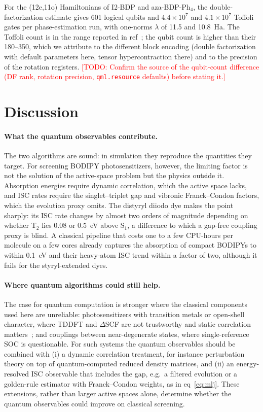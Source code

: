 \documentclass[journal=jpcafh,manuscript=article]{achemso}
\newcommand{\todo}[1]{\textcolor{red}{[TODO: #1]}}
\begin{document}
For the (12e,11o) Hamiltonians of I2-BDP and aza-BDP-Ph$_4$, the double-factorization estimate gives
601 logical qubits and $4.4\times10^{7}$ and $4.1\times10^{7}$ Toffoli gates per phase-estimation run,
with one-norms $\lambda$ of 11.5 and 10.8~Ha. The Toffoli count is in the range reported in
ref~; the qubit count is higher than their 180--350, which we attribute to the
different block encoding (double factorization with default parameters here, tensor hypercontraction
there) and to the precision of the rotation registers. \todo{Confirm the source of the qubit-count
difference (DF rank, rotation precision, \texttt{qml.resource} defaults) before stating it.}

\section{Discussion}

\paragraph{What the quantum observables contribute.} The two algorithms are sound: in simulation they
reproduce the quantities they target. For screening BODIPY photosensitizers, however, the
limiting factor is not the solution of the active-space problem but the physics outside it.
Absorption energies require dynamic correlation, which the active space lacks, and ISC rates require
the singlet--triplet gap and vibronic Franck--Condon factors, which the evolution proxy omits. The
distyryl diiodo dye makes the point sharply: its ISC rate changes by almost two orders of magnitude
depending on whether T$_2$ lies 0.08 or 0.5~eV above S$_1$, a difference to which a gap-free coupling
proxy is blind. A
classical pipeline that costs one to a few CPU-hours per molecule on a few cores already captures the
absorption of compact BODIPYs to within 0.1~eV and their heavy-atom ISC trend within a factor of
two, although it fails for the styryl-extended dyes.

\paragraph{Where quantum algorithms could still help.} The case for quantum computation is stronger
where the classical components used here are unreliable: photosensitizers with transition metals or
open-shell character, where TDDFT and $\Delta$SCF are not trustworthy and static correlation
matters~\cite{Zhou2025}; and couplings between near-degenerate states, where single-reference SOC
is questionable. For such systems the quantum observables should be combined with (i) a dynamic
correlation treatment, for instance perturbation theory on top of quantum-computed reduced density
matrices, and (ii) an energy-resolved ISC observable that includes the gap, e.g.\ a filtered
evolution or a golden-rule estimator with Franck--Condon weights, as in eq~\ref{eq:mlj}. These
extensions, rather than larger active spaces alone, determine whether the quantum observables could
improve on classical screening.
\end{document}
